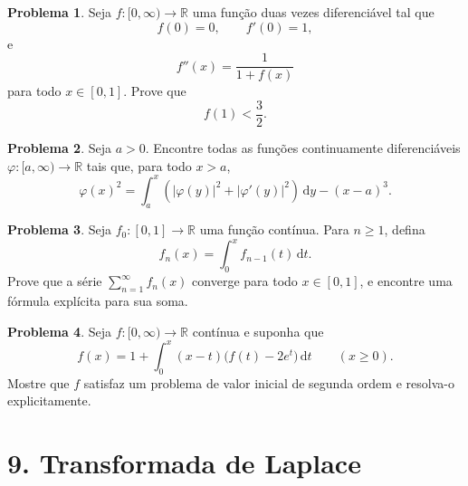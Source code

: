 \documentclass[10pt,a4paper]{amsart}
\newcommand{\R}{\mathbb{R}}
\renewcommand{\d}{\mathrm{d}}
\theoremstyle{definition}
\newtheorem{problema}{Problema}
\begin{document}
\begin{problema}
Seja $f:[0,\infty)\to\R$ uma função duas vezes diferenciável tal que
\[
    f(0)=0,\qquad f'(0)=1,
\]
e
\[
    f''(x)=\frac{1}{1+f(x)}
\]
para todo $x\in[0,1]$. Prove que
\[
    f(1)<\frac{3}{2}.
\]
\end{problema}

\begin{problema}
Seja $a>0$. Encontre todas as funções continuamente diferenciáveis
$\varphi:[a,\infty)\to\R$ tais que, para todo $x>a$,
\[
    \varphi(x)^2
    =
    \int_a^x \left(|\varphi(y)|^2+|\varphi'(y)|^2\right)\,\d y
    -(x-a)^3.
\]
\end{problema}

\begin{problema}
Seja $f_0:[0,1]\to\R$ uma função contínua. Para $n\ge 1$, defina
\[
    f_n(x)=\int_0^x f_{n-1}(t)\,\d t.
\]
Prove que a série $\sum_{n=1}^{\infty} f_n(x)$ converge para todo
$x\in[0,1]$, e encontre uma fórmula explícita para sua soma.
\end{problema}

\begin{problema}
Seja $f:[0,\infty)\to\R$ contínua e suponha que
\[
    f(x)=1+\int_0^x (x-t)\bigl(f(t)-2e^t\bigr)\,\d t
    \qquad(x\ge 0).
\]
Mostre que $f$ satisfaz um problema de valor inicial de segunda ordem e
resolva-o explicitamente.
\end{problema}

\section*{9. Transformada de Laplace}
\end{document}
